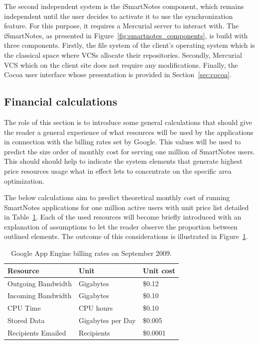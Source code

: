 The second independent system is the iSmartNotes component, which remains independent until the user decides to activate it to use the synchronization feature. For this purpose, it requires a Mercurial server to interact with. The iSmartNotes, as presented in Figure~\ref{fig:smartnotes_components}, is build with three components. Firstly, the file system of the client's operating system which is the classical space where VCSs allocate their repositories. Secondly, Mercurial VCS which on the client site does not require any modifications. Finally, the Cocoa user interface whose presentation is provided in Section~\ref{sec:cocoa}.

\subsection{Financial calculations}\label{subsec:gae_calculations}
The role of this section is to introduce some general calculations that should give the reader a general experience of what resources will be used by the applications in connection with the billing rates set by Google. This values will be used to predict the size order of monthly cost for serving one million of SmartNotes users. This should should help to indicate the system elements that generate highest price resources usage what in effect lets to concentrate on the specific area optimization. 

The below calculations aim to predict theoretical monthly cost of running SmartNotes applications for one million active users with unit price list detailed in Table~\ref{tab:gae_cost}. Each of the used resources will become briefly introduced with an explanation of assumptions to let the reader observe the proportion between outlined elements. The outcome of this considerations is illustrated in Figure~\ref{tab:gae_cost}.
\begin{table}[h]
\centering
\caption{Google App Engine billing rates on September 2009.}
\label{tab:gae_cost}
\begin{tabular}{|l|l|l|} \hline \hline
\textbf{Resource} & \textbf{Unit} & \textbf{Unit cost} \\ \hline \hline
Outgoing Bandwidth & Gigabytes & \$0.12 \\ \hline
Incoming Bandwidth & Gigabytes & \$0.10 \\ \hline
CPU Time & CPU hours & \$0.10 \\ \hline
Stored Data & Gigabytes per Day & \$0.005 \\ \hline
Recipients Emailed & Recipients & \$0.0001\\ \hline \hline
\end{tabular}
\end{table}


